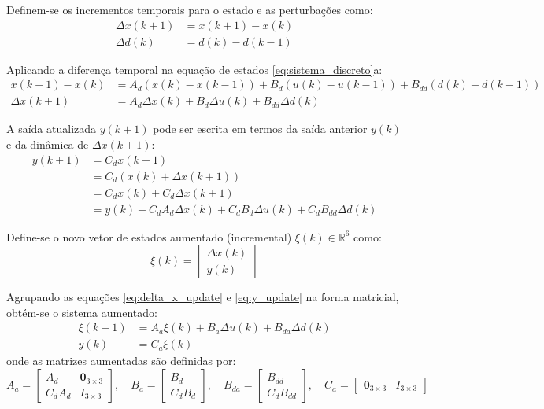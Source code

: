 \documentclass[12pt,journal,onecolumn]{article}
\begin{document}
Definem-se os incrementos temporais para o estado e as perturbações como:
\begin{align}
\Delta x(k+1) &= x(k+1) - x(k) \\
\Delta d(k) &= d(k) - d(k-1)
\end{align}

Aplicando a diferença temporal na equação de estados \eqref{eq:sistema_discreto}a:
\begin{align}
x(k+1) - x(k) &= A_d (x(k) - x(k-1)) + B_d (u(k) - u(k-1)) + B_{dd} (d(k) - d(k-1)) \nonumber \\
\Delta x(k+1) &= A_d \Delta x(k) + B_d \Delta u(k) + B_{dd} \Delta d(k)
\label{eq:delta_x_update}
\end{align}

A saída atualizada $y(k+1)$ pode ser escrita em termos da saída anterior $y(k)$ e da dinâmica de $\Delta x(k+1)$:
\begin{align}
y(k+1) &= C_d x(k+1) \nonumber \\
       &= C_d (x(k) + \Delta x(k+1)) \nonumber \\
       &= C_d x(k) + C_d \Delta x(k+1) \nonumber \\
       &= y(k) + C_d A_d \Delta x(k) + C_d B_d \Delta u(k) + C_d B_{dd} \Delta d(k)
\label{eq:y_update}
\end{align}

Define-se o novo vetor de estados aumentado (incremental) $\xi(k) \in \mathbb{R}^6$ como:
\begin{equation}
\xi(k) = \begin{bmatrix} \Delta x(k) \\ y(k) \end{bmatrix}
\end{equation}

Agrupando as equações \eqref{eq:delta_x_update} e \eqref{eq:y_update} na forma matricial, obtém-se o sistema aumentado:
\begin{subequations}
\label{eq:sistema_aumentado}
\begin{align}
\xi(k+1) &= A_a \xi(k) + B_a \Delta u(k) + B_{da} \Delta d(k) \\
y(k) &= C_a \xi(k)
\end{align}
\end{subequations}
onde as matrizes aumentadas são definidas por:
\begin{equation}
A_a = \begin{bmatrix} A_d & \bm{0}_{3 \times 3} \\ C_d A_d & I_{3 \times 3} \end{bmatrix}, \quad
B_a = \begin{bmatrix} B_d \\ C_d B_d \end{bmatrix}, \quad
B_{da} = \begin{bmatrix} B_{dd} \\ C_d B_{dd} \end{bmatrix}, \quad
C_a = \begin{bmatrix} \bm{0}_{3 \times 3} & I_{3 \times 3} \end{bmatrix}
\end{equation}
\end{document}
